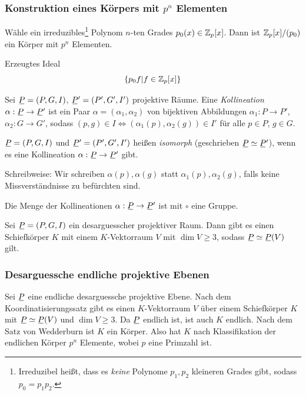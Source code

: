 \subsubsection*{Konstruktion eines Körpers mit \texorpdfstring{$p^n$}{p hoch n} Elementen}
Wähle ein irreduzibles\footnote{Irreduzibel heißt, dass es \emph{keine} Polynome $p_1, p_2$ kleineren Grades gibt, sodass $p_0 = p_1 p_2$.} Polynom $n$-ten Grades $p_0(x) \in \mathbb{Z}_p[x]$. Dann ist $\mathbb{Z}_p[x] / (p_0)$ ein Körper mit $p^n$ Elementen.

Erzeugtes Ideal
\[ \{ p_0 f | f \in \mathbb{Z}_p[x] \} \]

\begin{defn*}\label{def:kollineation}
 Sei $\proj = (P,G,I)$, $\proj' = (P',G',I')$ projektive Räume. Eine \emph{Kollineation} $\alpha: \proj \to \proj'$ ist ein Paar $\alpha = (\alpha_1, \alpha_2)$ von bijektiven Abbildungen $\alpha_1:P \to P'$, $\alpha_2: G \to G'$, sodass $(p,g) \in I \Leftrightarrow (\alpha_1(p), \alpha_2(g) ) \in I'$ für alle $p \in P$, $g \in G$. 
 
 $\proj=(P,G,I)$ und $\proj' = (P', G', I')$ heißen \emph{isomorph} (geschrieben $\proj \simeq \proj'$), wenn es eine Kollineation $\alpha: \proj \to \proj'$ gibt.
 
 Schreibweise: Wir schreiben $\alpha(p), \alpha(g)$ statt $\alpha_1(p), \alpha_2(g)$, falls keine Missverständnisse zu befürchten sind.
\end{defn*}

\begin{bem}
 Die Menge der Kollineationen $\alpha: \proj \to \proj'$ ist mit $\circ$ eine Gruppe.
\end{bem}

\begin{thm*}[Koordinatisierungssatz]
 Sei $\proj = (P,G,I)$ ein desarguesscher projektiver Raum. Dann gibt es einen Schiefkörper $K$ mit einem $K$-Vektorraum $V$ mit $\dim V \ge 3$, sodass $\proj \simeq \proj(V)$ gilt.
\end{thm*}

\subsubsection*{Desarguessche endliche projektive Ebenen}
Sei $\proj$ eine endliche desarguessche projektive Ebene. Nach dem Koordinatisierungssatz gibt es einen $K$-Vektorraum $V$ über einem Schiefkörper $K$ mit $\proj \simeq \proj(V)$ und $\dim V \ge 3$. Da $\proj$ endlich ist, ist auch $K$ endlich. Nach dem Satz von Wedderburn ist $K$ ein Körper. Also hat $K$ nach Klassifikation der endlichen Körper $p^n$ Elemente, wobei $p$ eine Primzahl ist.

